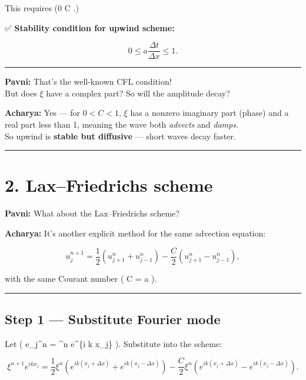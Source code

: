 \documentclass[
  letterpaper,
]{book}
\begin{document}
This requires (0 \le C .)

✅ \textbf{Stability condition for upwind scheme:}

\[
\boxed{\displaystyle 0 \le a\frac{\Delta t}{\Delta x} \le 1.}
\]

\begin{center}\rule{0.5\linewidth}{0.5pt}\end{center}

\textbf{Pavni:} That's the well-known CFL condition!\\
But does \(\xi\) have a complex part? So will the amplitude decay?

\textbf{Acharya:} Yes --- for \(0 < C < 1\), \(\xi\) has a nonzero
imaginary part (phase) and a real part less than 1, meaning the wave
both \emph{advects} and \emph{damps}.\\
So upwind is \textbf{stable but diffusive} --- short waves decay faster.

\begin{center}\rule{0.5\linewidth}{0.5pt}\end{center}

\section{2. Lax--Friedrichs scheme}\label{laxfriedrichs-scheme}

\textbf{Pavni:} What about the Lax--Friedrichs scheme?

\textbf{Acharya:} It's another explicit method for the same advection
equation:

\[
u_j^{n+1} = \frac{1}{2}(u_{j+1}^n + u_{j-1}^n) - \frac{C}{2}(u_{j+1}^n - u_{j-1}^n),
\]

with the same Courant number ( C = a  ).

\begin{center}\rule{0.5\linewidth}{0.5pt}\end{center}

\subsection{Step 1 --- Substitute Fourier
mode}\label{step-1-substitute-fourier-mode}

Let ( e\_j\^{}n = \xi\^{}n e\^{}\{i k x\_j\} ). Substitute into the
scheme:

\[
\xi^{n+1} e^{i k x_j}
= \frac{1}{2}\xi^n (e^{i k (x_j + \Delta x)} + e^{i k (x_j - \Delta x)}) - \frac{C}{2}\xi^n (e^{i k (x_j + \Delta x)} - e^{i k (x_j - \Delta x)}).
\]
\end{document}
